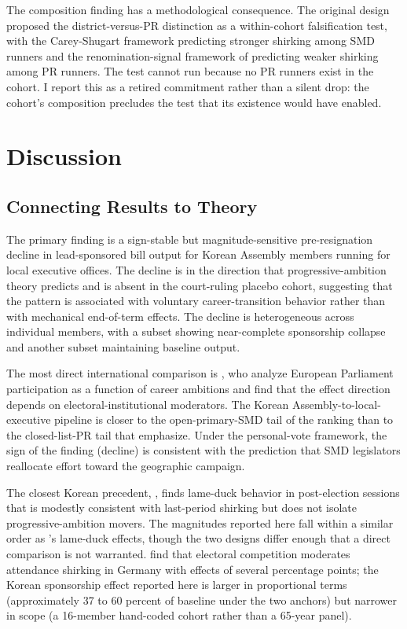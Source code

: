 \documentclass[11pt]{article}
\begin{document}
The composition finding has a methodological consequence. The original design proposed the district-versus-PR distinction as a within-cohort falsification test, with the Carey-Shugart framework predicting stronger shirking among SMD runners and the renomination-signal framework of \citet{hoyland2017} predicting weaker shirking among PR runners. The test cannot run because no PR runners exist in the cohort. I report this as a retired commitment rather than a silent drop: the cohort's composition precludes the test that its existence would have enabled.

\section{Discussion}

\subsection{Connecting Results to Theory}

The primary finding is a sign-stable but magnitude-sensitive pre-resignation decline in lead-sponsored bill output for Korean Assembly members running for local executive offices. The decline is in the direction that progressive-ambition theory predicts and is absent in the court-ruling placebo cohort, suggesting that the pattern is associated with voluntary career-transition behavior rather than with mechanical end-of-term effects. The decline is heterogeneous across individual members, with a subset showing near-complete sponsorship collapse and another subset maintaining baseline output.

The most direct international comparison is \citet{hoyland2017}, who analyze European Parliament participation as a function of career ambitions and find that the effect direction depends on electoral-institutional moderators. The Korean Assembly-to-local-executive pipeline is closer to the open-primary-SMD tail of the \citet{careyshugart1995} ranking than to the closed-list-PR tail that \citet{hoyland2017} emphasize. Under the personal-vote framework, the sign of the finding (decline) is consistent with the prediction that SMD legislators reallocate effort toward the geographic campaign.

The closest Korean precedent, \citet{koo2018}, finds lame-duck behavior in post-election sessions that is modestly consistent with last-period shirking but does not isolate progressive-ambition movers. The magnitudes reported here fall within a similar order as \citet{koo2018}'s lame-duck effects, though the two designs differ enough that a direct comparison is not warranted. \citet{frankstadelmann2021} find that electoral competition moderates attendance shirking in Germany with effects of several percentage points; the Korean sponsorship effect reported here is larger in proportional terms (approximately 37 to 60 percent of baseline under the two anchors) but narrower in scope (a 16-member hand-coded cohort rather than a 65-year panel).
\end{document}
